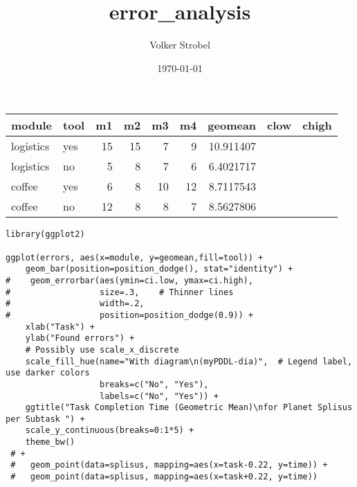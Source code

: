 \documentclass[11pt]{article}
\author{Volker Strobel}
\date{\today}
\title{error\_analysis}
\begin{document}
\maketitle
\tableofcontents

\begin{center}
\begin{tabular}{llrrrrrll}
module & tool & m1 & m2 & m3 & m4 & geomean & clow & chigh\\
\hline
logistics & yes & 15 & 15 & 7 & 9 & 10.911407 &  & \\
logistics & no & 5 & 8 & 7 & 6 & 6.4021717 &  & \\
coffee & yes & 6 & 8 & 10 & 12 & 8.7117543 &  & \\
coffee & no & 12 & 8 & 8 & 7 & 8.5627806 &  & \\
\end{tabular}
\end{center}


\begin{verbatim}
library(ggplot2)

ggplot(errors, aes(x=module, y=geomean,fill=tool)) + 
    geom_bar(position=position_dodge(), stat="identity") +
#    geom_errorbar(aes(ymin=ci.low, ymax=ci.high),
#                  size=.3,    # Thinner lines
#                  width=.2,
#                  position=position_dodge(0.9)) +
    xlab("Task") +
    ylab("Found errors") +
    # Possibly use scale_x_discrete
    scale_fill_hue(name="With diagram\n(myPDDL-dia)",  # Legend label, use darker colors
                   breaks=c("No", "Yes"),
                   labels=c("No", "Yes")) +
    ggtitle("Task Completion Time (Geometric Mean)\nfor Planet Splisus per Subtask ") +
    scale_y_continuous(breaks=0:1*5) +
    theme_bw()
 # +
 #   geom_point(data=splisus, mapping=aes(x=task-0.22, y=time)) + 
 #   geom_point(data=splisus, mapping=aes(x=task+0.22, y=time))
\end{verbatim}
\end{document}
